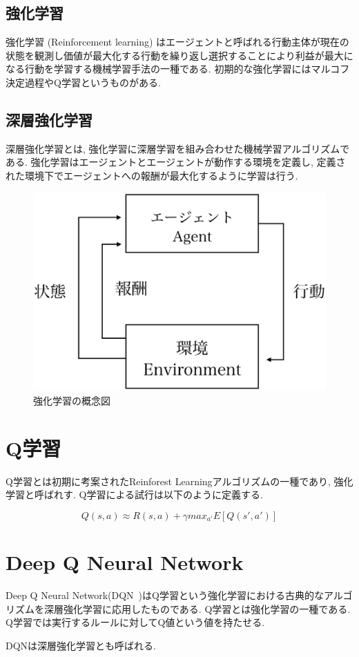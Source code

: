 \subsection{強化学習}

強化学習 (Reinforcement learning) はエージェントと呼ばれる行動主体が現在の状態を観測し価値が最大化する行動を繰り返し選択することにより利益が最大になる行動を学習する機械学習手法の一種である.
初期的な強化学習にはマルコフ決定過程やQ学習というものがある.

\subsection{深層強化学習}

深層強化学習とは, 強化学習に深層学習を組み合わせた機械学習アルゴリズムである.
強化学習はエージェントとエージェントが動作する環境を定義し, 定義された環境下でエージェントへの報酬が最大化するように学習は行う.

\begin{figure}[H]
    \centering
    \includegraphics[clip,width = 12.0cm]{assets/reinforcement_learning.eps}
    \caption{強化学習の概念図}  \label{sample}
\end{figure}

\section{Q学習}

Q学習とは初期に考案されたReinforest Learningアルゴリズムの一種であり, 強化学習と呼ばれす.
Q学習による試行は以下のように定義する.

\begin{equation}
    Q(s, a) \approx R(s, a) + \gamma max_{a'} E[Q(s', a')]
\end{equation}

\section{Deep Q Neural Network}

Deep Q Neural Network(DQN~\cite{DQN})はQ学習という強化学習における古典的なアルゴリズムを深層強化学習に応用したものである.
Q学習とは強化学習の一種である. Q学習では実行するルールに対してQ値という値を持たせる.

DQNは深層強化学習とも呼ばれる.


